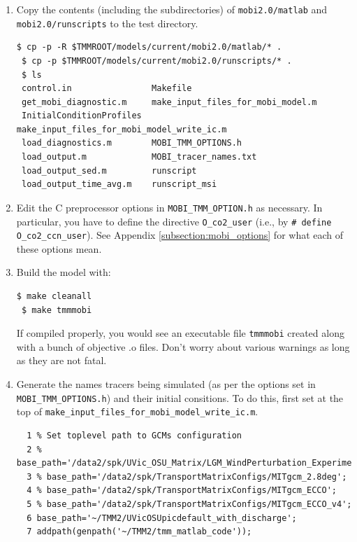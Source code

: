 \documentclass[a4paper]{article}
\def\noin{\noindent }
\begin{document}
\begin{enumerate}
\item Copy the contents (including the subdirectories) of \verb|mobi2.0/matlab| and  \verb|mobi2.0/runscripts| to the test directory.
\begin{lstlisting}[style=DOS]
 $ cp -p -R $TMMROOT/models/current/mobi2.0/matlab/* .
 $ cp -p $TMMROOT/models/current/mobi2.0/runscripts/* .
 $ ls
 control.in                Makefile
 get_mobi_diagnostic.m     make_input_files_for_mobi_model.m
 InitialConditionProfiles  make_input_files_for_mobi_model_write_ic.m
 load_diagnostics.m        MOBI_TMM_OPTIONS.h
 load_output.m             MOBI_tracer_names.txt
 load_output_sed.m         runscript
 load_output_time_avg.m    runscript_msi
\end{lstlisting}

\item Edit the C preprocessor options in \verb|MOBI_TMM_OPTION.h| as necessary. In particular, you have to define the directive \verb|O_co2_user| (i.e., by \verb|# define O_co2_ccn_user|). See Appendix \ref{subsection:mobi_options} for what each of these options mean. 

\item Build the model with:
\begin{lstlisting}[style=DOS]
 $ make cleanall
 $ make tmmmobi
\end{lstlisting}
\noin If compiled properly, you would see an executable file \verb|tmmmobi| created along with a bunch of objective .o files. Don't worry about various warnings as long as they are not fatal. 

\item Generate the names tracers being simulated (as per the options set in \verb|MOBI_TMM_OPTIONS.h|) and their initial consitions. To do this, first set at the top of \verb|make_input_files_for_mobi_model_write_ic.m|. 
\lstset{language=matlab} 
\begin{lstlisting}[frame=single,basicstyle=\scriptsize,commentstyle=\color{blue}]
 % make_input_files_for_mobi_model_write_ic.m
  1 % Set toplevel path to GCMs configuration
  2 % base_path='/data2/spk/UVic_OSU_Matrix/LGM_WindPerturbation_Experiments/no_embm_awind2/picdefault';
  3 % base_path='/data2/spk/TransportMatrixConfigs/MITgcm_2.8deg';
  4 % base_path='/data2/spk/TransportMatrixConfigs/MITgcm_ECCO';
  5 % base_path='/data2/spk/TransportMatrixConfigs/MITgcm_ECCO_v4';
  6 base_path='~/TMM2/UVicOSUpicdefault_with_discharge';
  7 addpath(genpath('~/TMM2/tmm_matlab_code'));
 

\end{lstlisting}
\end{enumerate}
\end{document}
